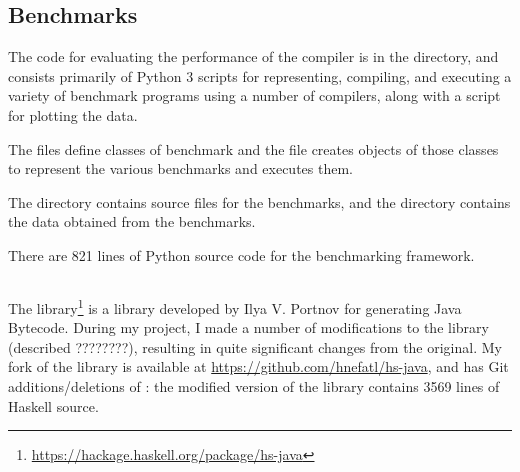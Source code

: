 \documentclass[dissertation.tex]{subfiles}
\begin{document}
{    \subsection{Benchmarks}
    {
        \begin{minipage}{0.7\textwidth}
        \vspace{-6.5cm}
        The code for evaluating the performance of the compiler is in the  directory, and consists
        primarily of Python 3 scripts for representing, compiling, and executing a variety of benchmark programs using a
        number of compilers, along with a script for plotting the data.

        The  files define classes of benchmark and the  file
        creates objects of those classes to represent the various benchmarks and executes them.

        The  directory contains source files for the benchmarks, and the 
        directory contains the data obtained from the benchmarks.

        There are 821 lines of Python source code for the benchmarking framework.
        \end{minipage}
        \hspace{5mm}
        \begin{minipage}{0.2\textwidth}
        \vspace{0pt}
        \footnotesize
        \end{minipage}
    }
    \subsection{}
    {
        \begin{minipage}{0.7\textwidth}
        \vspace{0pt}
        The  library\footnote{\url{https://hackage.haskell.org/package/hs-java}} is a library
        developed by Ilya V. Portnov for generating Java Bytecode. During my project, I made a number of modifications
        to the library (described ????????), resulting in quite significant changes from the original. My fork of the
        library is available at \url{https://github.com/hnefatl/hs-java}, and has Git additions/deletions of
        : the modified version of the library contains 3569 lines of Haskell source.


\end{minipage}}}
\end{document}
